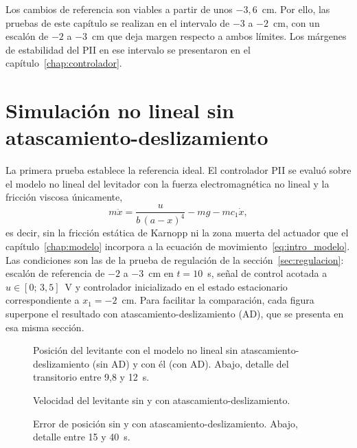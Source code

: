 Los cambios de referencia son viables a partir de unos $-3{,}6$~cm. Por ello, las pruebas de este capítulo se realizan en el intervalo de $-3$ a $-2$~cm, con un escalón de $-2$ a $-3$~cm que deja margen respecto a ambos límites. Los márgenes de estabilidad del PII en ese intervalo se presentaron en el capítulo~\ref{chap:controlador}.

\section{Simulación no lineal sin atascamiento-deslizamiento}

La primera prueba establece la referencia ideal. El controlador PII se evaluó sobre el modelo no lineal del levitador con la fuerza electromagnética no lineal y la fricción viscosa únicamente,
\begin{equation}
m\ddot{x} = \frac{u}{b\,(a-x)^4} - m g - m c_1 \dot{x} ,
\label{eq:nl_sin_ad}
\end{equation}
es decir, sin la fricción estática de Karnopp ni la zona muerta del actuador que el capítulo~\ref{chap:modelo} incorpora a la ecuación de movimiento~\eqref{eq:intro_modelo}. Las condiciones son las de la prueba de regulación de la sección~\ref{sec:regulacion}: escalón de referencia de $-2$ a $-3$~cm en $t=10$~s, señal de control acotada a $u\in[0;\,3{,}5]$~V y controlador inicializado en el estado estacionario correspondiente a $x_1=-2$~cm. Para facilitar la comparación, cada figura superpone el resultado con atascamiento-deslizamiento (AD), que se presenta en esa misma sección.

\begin{figure}[ht]
    \centering
    
    \caption[Sin AD: posición]{Posición del levitante con el modelo no lineal sin atascamiento-deslizamiento (sin AD) y con él (con AD). Abajo, detalle del transitorio entre 9,8 y 12~s.}
    \label{fig:sinad_pos}
\end{figure}

\begin{figure}[ht]
    \centering
    
    \caption[Sin AD: velocidad]{Velocidad del levitante sin y con atascamiento-deslizamiento.}
    \label{fig:sinad_vel}
\end{figure}

\begin{figure}[ht]
    \centering
    
    \caption[Sin AD: error]{Error de posición sin y con atascamiento-deslizamiento. Abajo, detalle entre 15 y 40~s.}
    \label{fig:sinad_error}
\end{figure}

